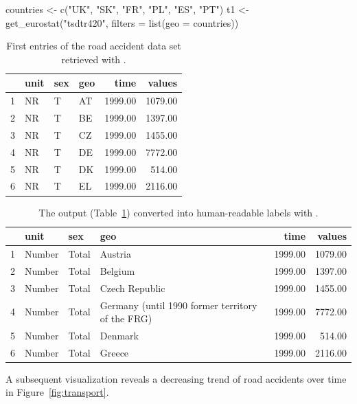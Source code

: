 \begin{example}
  countries <- c("UK", "SK", "FR", "PL", "ES", "PT")
  t1 <- get_eurostat("tsdtr420", filters = list(geo = countries)) 
\end{example}


\begin{table}[ht]
\centering
\begin{tabular}{rlllrr}
\toprule
    & unit & sex & geo & time & values \\ 
  \hline
  1 & NR & T & AT & 1999.00 & 1079.00 \\ 
  2 & NR & T & BE & 1999.00 & 1397.00 \\ 
  3 & NR & T & CZ & 1999.00 & 1455.00 \\ 
  4 & NR & T & DE & 1999.00 & 7772.00 \\ 
  5 & NR & T & DK & 1999.00 & 514.00 \\ 
  6 & NR & T & EL & 1999.00 & 2116.00 \\ 
\bottomrule   
\end{tabular}
\caption{First entries of the road accident data set retrieved with .}
\label{tab:getdatatable}
\end{table}


\begin{table}[ht]
\centering
\begin{tabular}{rlllrr}
\toprule
    & unit & sex & geo & time & values \\ 
  \hline
  1 & Number & Total & Austria & 1999.00 & 1079.00 \\ 
  2 & Number & Total & Belgium & 1999.00 & 1397.00 \\ 
  3 & Number & Total & Czech Republic & 1999.00 & 1455.00 \\ 
  4 & Number & Total & Germany (until 1990 former territory of the FRG) & 1999.00 & 7772.00 \\ 
  5 & Number & Total & Denmark & 1999.00 & 514.00 \\ 
  6 & Number & Total & Greece & 1999.00 & 2116.00 \\ 
\bottomrule      
\end{tabular}
\caption{The  output (Table~\ref{tab:getdatatable}) converted into human-readable labels with .}
\label{tab:getdatatable2}
\end{table}



A subsequent visualization reveals a decreasing trend of road accidents over time in Figure~\ref{fig:transport}.

